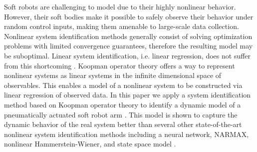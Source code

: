 Soft robots are challenging to model due to their highly  nonlinear behavior.
However, their soft bodies make it possible to safely observe their behavior under random control inputs, making them amenable to large-scale data collection.
Nonlinear system identification methods generally consist of solving optimization problems with limited convergence guarantees, therefore the resulting model may be suboptimal.
Linear system identification, i.e. linear regression, does not suffer from this shortcoming .
Koopman operator theory offers a way to represent nonlinear systems as linear systems in the infinite dimensional space of observables.
This enables a model of a nonlinear system to be constructed via linear regression of observed data.
In this paper we apply a system identification method based on Koopman operator theory to identify a dynamic model of a pneumatically actuated soft robot arm .
This model is shown to capture the dynamic behavior of the real system better than several other  state-of-the-art  nonlinear  system identification  methods  including  a  neural  network, NARMAX, nonlinear Hammerstein-Wiener, and state space model .